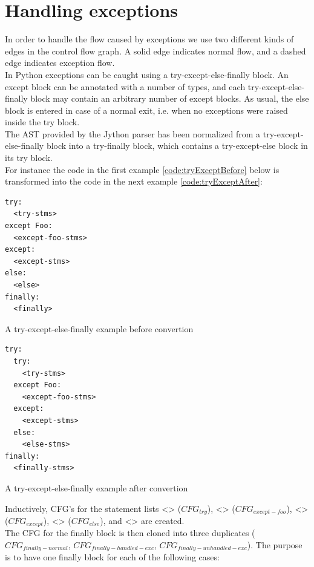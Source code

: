 \section{Handling exceptions}
In order to handle the flow caused by exceptions we use two different kinds of edges in the control flow graph. A solid edge indicates normal flow, and a dashed edge indicates exception flow. \\
In Python exceptions can be caught using a try-except-else-finally block. An except block can be annotated with a number of types, and each try-except-else-finally block may contain an arbitrary number of except blocks. As usual, the else block is entered in case of a normal exit, i.e. when no exceptions were raised inside the try block. \\
The AST provided by the Jython parser has been normalized from a try-except-else-finally block into a try-finally block, which contains a try-except-else block in its try block. \\
For instance the code in the first example \ref{code:tryExceptBefore} below is transformed into the code in the next example \ref{code:tryExceptAfter}:

\begin{listing}[H]
	\begin{verbatim}
try:
  <try-stms>
except Foo:
  <except-foo-stms>
except:
  <except-stms>
else: 
  <else>
finally:
  <finally>
	\end{verbatim}
	\caption{A try-except-else-finally example before convertion}\label{code:tryExceptBefore}
\end{listing}

\begin{listing}[H]
	\begin{verbatim}
try: 
  try:
    <try-stms>
  except Foo:
    <except-foo-stms>
  except:
    <except-stms>
  else:
    <else-stms>
finally:
  <finally-stms>
	\end{verbatim}
	\caption{A try-except-else-finally example after convertion}\label{code:tryExceptAfter}
\end{listing}

Inductively, CFG's for the statement lists <> ($CFG_{try}$), <> ($CFG_{except-foo}$), <> ($CFG_{except}$), <> ($CFG_{else}$), and <> are created. \\
The CFG for the finally block is then cloned into three duplicates ($CFG_{finally-normal}$, $CFG_{finally-handled-exc}$, $CFG_{finally- unhandled-exc}$). The purpose is to have one finally block for each of the following cases: 

